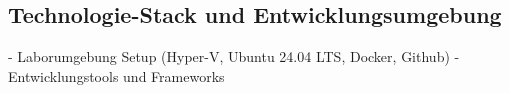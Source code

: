 \subsection{Technologie-Stack und Entwicklungsumgebung} \label{sec:Technologie-Stack und Entwicklungsumgebung}

- Laborumgebung Setup (Hyper-V, Ubuntu 24.04 LTS, Docker, Github)
- Entwicklungstools und Frameworks